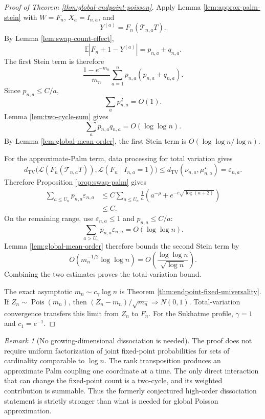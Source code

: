 \documentclass[11pt]{article}
\theoremstyle{remark}
\newtheorem{remark}[theorem]{Remark}
\newcommand{\Ee}{\mathbb E}
\newcommand{\TV}{\mathrm{TV}}
\newcommand{\Pois}{\operatorname{Pois}}
\begin{document}
\begin{proof}[Proof of Theorem \ref{thm:global-endpoint-poisson}]
Apply Lemma \ref{lem:approx-palm-stein} with
$W=F_n$, $X_a=I_{n,a}$, and
\[
        Y^{(a)}=F_n(\mathcal T_{n,a}T).
\]
By Lemma \ref{lem:swap-count-effect},
\[
        \Ee|F_n+1-Y^{(a)}|=p_{n,a}+q_{n,a}.
\]
The first Stein term is therefore
\[
        \frac{1-e^{-m_n}}{m_n}
        \sum_{a=1}^n p_{n,a}(p_{n,a}+q_{n,a}).
\]
Since $p_{n,a}\le C/a$,
\[
        \sum_a p_{n,a}^2=O(1).
\]
Lemma \ref{lem:two-cycle-sum} gives
\[
        \sum_a p_{n,a}q_{n,a}=O(\log\log n).
\]
By Lemma \ref{lem:global-mean-order}, the first Stein term is
$O(\log\log n/\log n)$.

For the approximate-Palm term, data processing for total variation gives
\[
 d_{\TV}\bigl(\mathcal L(F_n(\mathcal T_{n,a}T)),
 \mathcal L(F_n\mid I_{n,a}=1)\bigr)
 \le d_{\TV}(\nu_{n,a},\mu_{n,a}^\star)=\varepsilon_{n,a}.
\]
Therefore Proposition \ref{prop:swap-palm} gives
\[
\begin{aligned}
        \sum_{a\le U_n}p_{n,a}\varepsilon_{n,a}
        &\le C\sum_{a\le U_n}\frac1a
        \left(a^{-\rho}+e^{-c\sqrt{\log(a+2)}}\right)\\
        &\le C.
\end{aligned}
\]
On the remaining range, use $\varepsilon_{n,a}\le1$ and $p_{n,a}\le C/a$:
\[
        \sum_{a>U_n}p_{n,a}\varepsilon_{n,a}
        =O(\log\log n).
\]
Lemma \ref{lem:global-mean-order} therefore bounds the second Stein term by
\[
        O\left(m_n^{-1/2}\log\log n\right)
        =O\left(\frac{\log\log n}{\sqrt{\log n}}\right).
\]
Combining the two estimates proves the total-variation bound.

The exact asymptotic $m_n\sim c_\gamma\log n$ is Theorem
\ref{thm:endpoint-fixed-universality}.  If $Z_n\sim\Pois(m_n)$, then
$(Z_n-m_n)/\sqrt{m_n}\Rightarrow N(0,1)$.  Total-variation convergence
transfers this limit from $Z_n$ to $F_n$.  For the Sukhatme profile,
$\gamma=1$ and $c_1=e^{-1}$.
\end{proof}

\begin{remark}[No growing-dimensional dissociation is needed]\label{rem:no-high-order-dissociation}
The proof does not require uniform factorization of joint fixed-point
probabilities for sets of cardinality comparable to $\log n$.  The rank
transposition produces an approximate Palm coupling one coordinate at a time.
The only direct interaction that can change the fixed-point count is a two-cycle,
and its weighted contribution is summable.  Thus the formerly conjectured
high-order dissociation statement is strictly stronger than what is needed for
global Poisson approximation.
\end{remark}
\end{document}
